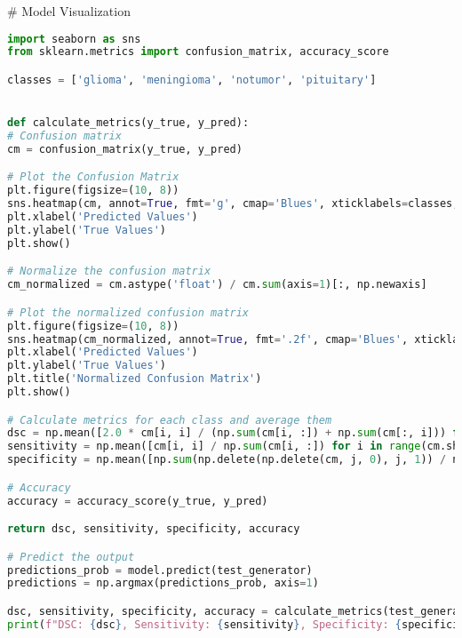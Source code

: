 # Model Visualization
\begin{lstlisting}[language=Python]
import seaborn as sns
from sklearn.metrics import confusion_matrix, accuracy_score

classes = ['glioma', 'meningioma', 'notumor', 'pituitary']


def calculate_metrics(y_true, y_pred):
# Confusion matrix
cm = confusion_matrix(y_true, y_pred)

# Plot the Confusion Matrix
plt.figure(figsize=(10, 8))
sns.heatmap(cm, annot=True, fmt='g', cmap='Blues', xticklabels=classes, yticklabels=classes)
plt.xlabel('Predicted Values')
plt.ylabel('True Values')
plt.show()

# Normalize the confusion matrix
cm_normalized = cm.astype('float') / cm.sum(axis=1)[:, np.newaxis]

# Plot the normalized confusion matrix
plt.figure(figsize=(10, 8))
sns.heatmap(cm_normalized, annot=True, fmt='.2f', cmap='Blues', xticklabels=classes, yticklabels=classes)
plt.xlabel('Predicted Values')
plt.ylabel('True Values')
plt.title('Normalized Confusion Matrix')
plt.show()

# Calculate metrics for each class and average them
dsc = np.mean([2.0 * cm[i, i] / (np.sum(cm[i, :]) + np.sum(cm[:, i])) for i in range(cm.shape[0])])
sensitivity = np.mean([cm[i, i] / np.sum(cm[i, :]) for i in range(cm.shape[0])])
specificity = np.mean([np.sum(np.delete(np.delete(cm, j, 0), j, 1)) / np.sum(np.delete(cm, j, 0)) for j in range(cm.shape[0])])

# Accuracy
accuracy = accuracy_score(y_true, y_pred)

return dsc, sensitivity, specificity, accuracy

# Predict the output
predictions_prob = model.predict(test_generator)
predictions = np.argmax(predictions_prob, axis=1)

dsc, sensitivity, specificity, accuracy = calculate_metrics(test_generator.classes, predictions)
print(f"DSC: {dsc}, Sensitivity: {sensitivity}, Specificity: {specificity}, Accuracy: {accuracy}")
\end{lstlisting}

